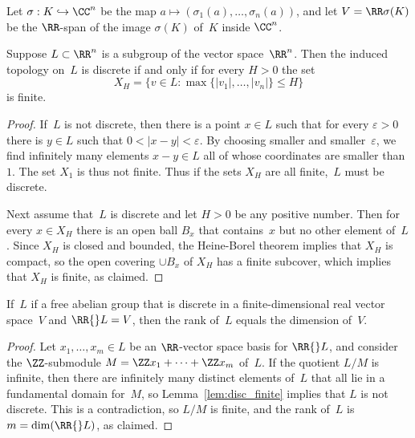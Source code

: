 Let $\sigma:K \hookrightarrow \CC^n$ be the map $a\mapsto
(\sigma_1(a),\ldots,\sigma_n(a))$, and let $V=\RR\sigma(K)$ be the
$\RR$-span of the image $\sigma(K)$ of~$K$ inside $\CC^n$.

\begin{lemma}\label{lem:disc_finite}
  Suppose $L\subset \RR^n$ is a subgroup of the vector space~$\RR^n$.
  Then the induced topology on~$L$ is discrete if and only
  if for every  $H>0$ the set
  $$
  X_H = \{v \in L : \max\{|v_1|,\ldots, |v_n|\} \leq H \}
  $$
  is finite.
\end{lemma}
\begin{proof}
  If~$L$ is not discrete, then there is a point $x \in L$ such that
  for every $\varepsilon > 0$ there is $y\in L$ such that
  $0 < |x-y| < \varepsilon$. By choosing smaller and smaller~$\varepsilon$,
  we find infinitely many elements $x-y\in L$
  all of whose coordinates are smaller than~$1$.
  The set $X_1$ is thus not finite.   Thus if the sets
  $X_H$ are all finite,~$L$ must be discrete.
  
  Next assume that~$L$ is discrete and let $H>0$ be any positive number.
  Then for every $x\in X_H$ there is an open ball $B_x$ that
  contains~$x$ but no other element of~$L$.  Since $X_H$ is closed and
  bounded, the Heine-Borel theorem implies that $X_H$ is compact, so the
  open covering $\cup B_x$ of $X_H$ has a finite subcover, which
  implies that $X_H$ is finite, as claimed.
\end{proof}

\begin{lemma}\label{lem:disc_rankdim}
  If~$L$ if a free abelian group that is
  discrete in a finite-dimensional
  real vector space~$V$ and $\RR{}L=V$, then the rank of~$L$
  equals the dimension of~$V$.
\end{lemma}
\begin{proof}
  Let $x_1,\ldots, x_m \in L$ be an $\RR$-vector space basis for
  $\RR{}L$, and consider the $\ZZ$-submodule $M=\ZZ x_1 + \cdots + \ZZ
  x_m$ of~$L$.  If the quotient $L/M$ is infinite, then there are
  infinitely many distinct elements of~$L$ that all lie in a
  fundamental domain for~$M$, so Lemma~\ref{lem:disc_finite} implies
  that $L$ is not discrete.  This is a contradiction, so $L/M$ is
  finite, and the rank of~$L$ is $m=\dim(\RR{}L)$, as claimed.
\end{proof}

